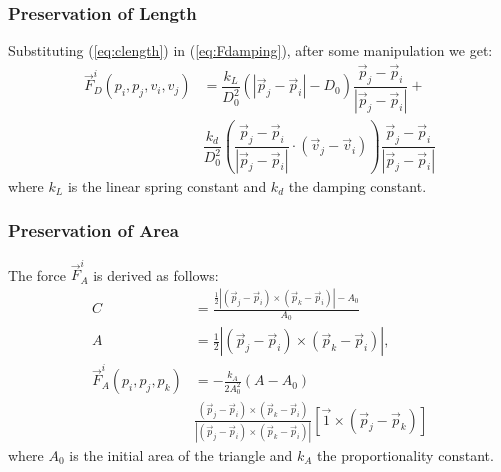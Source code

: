 \documentclass[journal]{IEEEtran}
\newcommand{\eref}[1]{(\ref{#1})}
\begin{document}

%
\label{ap:formulas}

\subsubsection{Preservation of Length}

Substituting \eref{eq:clength} in \eref{eq:Fdamping}, after some manipulation we get:
\begin{align}
 \vec{F}^i_D(p_i,p_j,v_i,v_j) &= \dfrac{k_L}{D_0^2} \left( |\vec{p}_j-\vec{p}_i|-D_0 \right) \dfrac{\vec{p}_j-\vec{p}_i}{|\vec{p}_j-\vec{p}_i|}  + \nonumber \\
 & \dfrac{k_d}{D_0^2}\left( \dfrac{\vec{p}_j-\vec{p}_i}{|\vec{p}_j-\vec{p}_i|} \cdot (\vec{v}_j-\vec{v}_i) \right) \dfrac{\vec{p}_j-\vec{p}_i}{|\vec{p}_j-\vec{p}_i|} \label{eq:FDlength}
\end{align}
where $k_L$ is the linear spring constant and $k_d$ the damping constant.

\subsubsection{Preservation of Area}

The force $\vec{F}^i_A$ is derived as follows: 
\begin{align}
 C &= \frac{\frac{1}{2}|(\vec{p}_j-\vec{p}_i)\times(\vec{p}_k-\vec{p}_i)|-A_0}{A_0} \\
 A &= \frac{1}{2}|(\vec{p}_j-\vec{p}_i)\times(\vec{p}_k-\vec{p}_i)|, \\
 \vec{F}^i_A(p_i,p_j,p_k) &= -\frac{k_A}{2A_0^2} \left( A-A_0 \right) \nonumber \\
 & \frac{(\vec{p}_j-\vec{p}_i)\times(\vec{p}_k-\vec{p}_i)}{|(\vec{p}_j-\vec{p}_i)\times(\vec{p}_k-\vec{p}_i)|} [\vec{1} \times (\vec{p}_j-\vec{p}_k)] \label{eq:area_force}
\end{align}
where $A_0$ is the initial area of the triangle and $k_A$ the proportionality constant.
\end{document}
